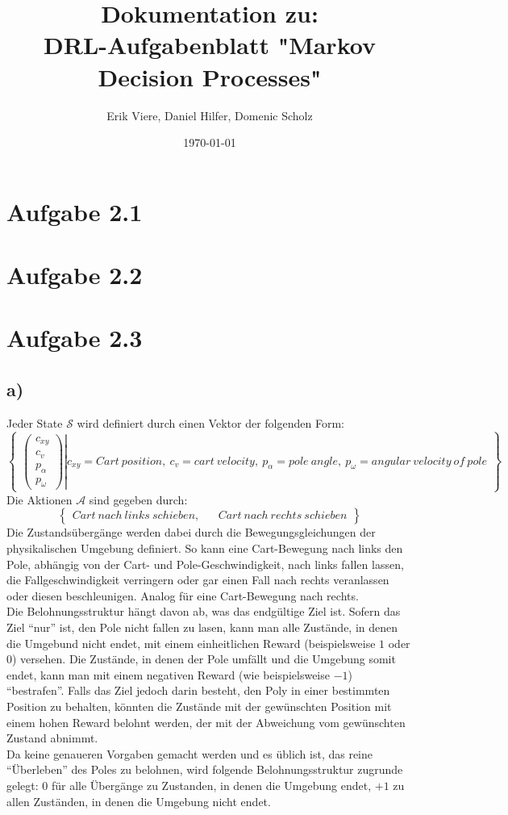 \documentclass[11pt]{article}
\title{\textbf{Dokumentation zu:\\DRL-Aufgabenblatt "Markov Decision Processes"}}
\author{Erik Viere, Daniel Hilfer, Domenic Scholz}
\date{\today}
\begin{document}
\maketitle	
\pagebreak

\section*{Aufgabe 2.1}
\section*{Aufgabe 2.2}
\section*{Aufgabe 2.3}
\subsection*{a)}
Jeder State $\mathcal{S}$ wird definiert durch einen Vektor der folgenden Form:
\[ %
\begin{Bmatrix}
    \left.
    \begin{pmatrix}
        c_{xy}\\
        c_v\\
        p_\alpha\\
        p_\omega
    \end{pmatrix}
    \right\vert
    c_{xy} = Cart~position,~c_v = cart~velocity,~p_\alpha = pole~angle,~p_\omega = angular~velocity~of~pole
\end{Bmatrix}
\]%
Die Aktionen $\mathcal{A}$ sind gegeben durch:
\[ %
\begin{Bmatrix}
    Cart~nach~links~schieben, && Cart~nach~rechts~schieben
\end{Bmatrix}
\]%
Die Zustandsübergänge werden dabei durch die Bewegungsgleichungen der physikalischen Umgebung definiert. So kann eine Cart-Bewegung nach links den Pole, abhängig von der Cart- und Pole-Geschwindigkeit, nach links fallen lassen, die Fallgeschwindigkeit verringern oder gar einen Fall nach rechts veranlassen oder diesen beschleunigen. Analog für eine Cart-Bewegung nach rechts.\\
Die Belohnungsstruktur hängt davon ab, was das endgültige Ziel ist. Sofern das Ziel ``nur'' ist, den Pole nicht fallen zu lasen, kann man alle Zustände, in denen die Umgebund nicht endet, mit einem einheitlichen Reward (beispielsweise $1$ oder $0$) versehen. Die Zustände, in denen der Pole umfällt und die Umgebung somit endet, kann man mit einem negativen Reward (wie beispielsweise $-1$) ``bestrafen''. Falls das Ziel jedoch darin besteht, den Poly in einer bestimmten Position zu behalten, könnten die Zustände mit der gewünschten Position mit einem hohen Reward belohnt werden, der mit der Abweichung vom gewünschten Zustand abnimmt.\\
Da keine genaueren Vorgaben gemacht werden und es üblich ist, das reine ``Überleben'' des Poles zu belohnen, wird folgende Belohnungsstruktur zugrunde gelegt: $0$ für alle Übergänge zu Zustanden, in denen die Umgebung endet, $+1$ zu allen Zuständen, in denen die Umgebung nicht endet. 
\end{document}
